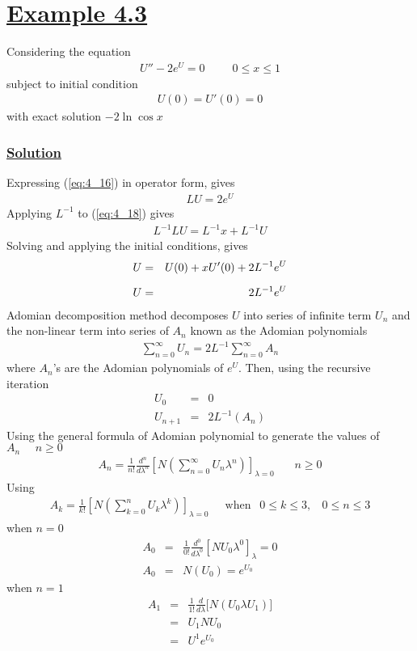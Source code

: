 \documentclass[11pt]{report}
\newcommand{\ubt}[1]{\textbf{\underline{#1}}}
\newcommand{\sps}{\\[0.2cm]}
\newcommand{\refn}[1]{(\ref{#1})}
\newcommand{\refx}[1]{\refn{eq:#1}}
\newcommand{\sprime}{'}
\newcommand{\dprime}{''}
\newcommand{\example}[1]{\section*{\ubt{Example #1}}}
\newcommand{\solution}{\subsubsection{\ubt{Solution}}}
\begin{document}
	\example{4.3}
	Considering the equation 
	\begin{eqnarray}
		U\dprime - 2e^U = 0 ~~~~~~~~~~~ 0 \leq x \leq 1\label{eq:4_16}
	\end{eqnarray}
	subject to initial condition
	\begin{eqnarray}
		U(0)  = U\sprime(0) = 0\label{eq:4_17}
	\end{eqnarray}
	with exact solution $-2\ln\cos x$
	\solution
	Expressing \refx{4_16} in operator form, gives
	\begin{eqnarray}
		LU = 2e^U\label{eq:4_18}
	\end{eqnarray}
	Applying $L^{-1}$ to \refx{4_18} gives
	\begin{eqnarray}
		L^{-1}LU = L^{-1}x + L^{-1}U
	\end{eqnarray}
	Solving and applying the initial conditions, gives
	\begin{eqnarray}
		U &=&U(0) + xU\sprime(0) + 2L^{-1}e^U\notag\sps
		U &=& 2L^{-1}e^U\label{eq:4_20}
	\end{eqnarray}
	Adomian decomposition method decomposes $U$ into series of infinite term $U_n$ and the non-linear term into series of $A_n$ known as the Adomian polynomials
	\begin{eqnarray}
		\sum_{n=0}^\infty U_n = 2L^{-1}\sum_{n=0}^\infty A_n\label{eq:4_21}
	\end{eqnarray}	
	where $A_n$'s are the Adomian polynomials of $e^U$. Then, using the recursive iteration
	\begin{eqnarray*}
		U_0 &=&0 \sps
		U_{n+1} &=& 2L^{-1}(A_n)
	\end{eqnarray*}
	Using the general formula of Adomian polynomial to generate the values of $A_n~~~~~~ n\geq 0$ 
	\begin{eqnarray*}
		A_n = \frac{1}{n!}\frac{d^n}{d\lambda^n}\left[N\left(\sum_{n=0}^\infty U_n\lambda^n\right)\right]_{\lambda=0} ~~~~~~~~ n\geq 0
	\end{eqnarray*}
	Using 
	\begin{eqnarray*}
		A_k = \frac{1}{k!}\left[N\left(\sum_{k=0}^n U_k\lambda^k\right)\right]_{\lambda=0} ~~~~~ \text{ when }~~ 0 \leq k \leq 3, ~~~~ 0 \leq n \leq 3
	\end{eqnarray*}
	when $n=0$
	\begin{eqnarray*}
		A_0 &=&\frac{1}{0!}\frac{d^0}{d\lambda^0}\left[N U_0\lambda^0\right]_\lambda=0\sps
		A_0 &=& N(U_0) = e^{U_0}
	\end{eqnarray*}
	when $n=1$
	\begin{eqnarray*}
		A_1 &=&\frac{1}{1!}\frac{d}{d\lambda}\Big[N (U_0\lambda U_1)\Big]\sps
		&=& U_1NU_0\sps
		&=& U^1e^{U_0}
	\end{eqnarray*}
\end{document}
